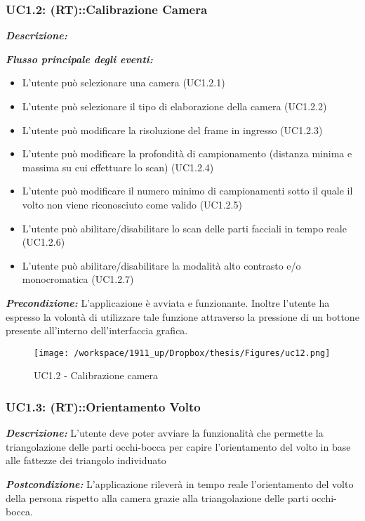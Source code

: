 \subsubsection{UC1.2: (RT)::Calibrazione Camera}

\textbf{\textit{Descrizione:}} 

\textbf{\textit{Flusso principale degli eventi:}} 

\begin{itemize}
\item L'utente può selezionare una camera (UC1.2.1)
\item L'utente può selezionare il tipo di elaborazione della camera (UC1.2.2)
\item L'utente può modificare la risoluzione del frame in ingresso (UC1.2.3)
\item L'utente può modificare la profondità di campionamento (distanza minima e massima su cui effettuare lo scan) (UC1.2.4)
\item L'utente può modificare il numero minimo di campionamenti sotto il quale il volto non viene riconosciuto come valido (UC1.2.5)
\item L'utente può abilitare/disabilitare lo scan delle parti facciali in tempo reale (UC1.2.6)
\item L'utente può abilitare/disabilitare la modalità alto contrasto e/o monocromatica (UC1.2.7)
\end{itemize}

\textbf{\textit{Precondizione:}} L'applicazione è avviata e funzionante. Inoltre l'utente ha espresso la volontà di utilizzare tale funzione attraverso la pressione di un bottone presente all'interno dell'interfaccia grafica.

\begin{figure}[H]\centering  
\texttt{[image: /workspace/1911\_up/Dropbox/thesis/Figures/uc12.png]}
\caption[UC1.2 - Calibrazione camera]{UC1.2 - Calibrazione camera}
\end{figure}

\subsubsection{UC1.3: (RT)::Orientamento Volto}

\textbf{\textit{Descrizione:}} L'utente deve poter avviare la funzionalità che permette la triangolazione delle parti occhi-bocca per capire l'orientamento del volto in base alle fattezze dei triangolo individuato

\textbf{\textit{Postcondizione:}} L'applicazione rileverà in tempo reale l'orientamento del volto della persona rispetto alla camera grazie alla triangolazione delle parti occhi-bocca.


